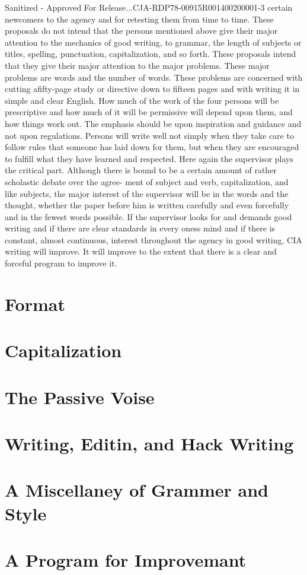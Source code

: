\documentclass[
    oneside,
    11pt,
    draft
]{memoir}
\begin{document}
Sanitized - Approved For Release...CJA-RDP78-00915R001400200001-3 certain newcomers to the agency and for retesting them from time to time. These proposals do not intend that the persons mentioned above give their major attention to the mechanics of good writing, to grammar, the length of subjects or titles, spelling, punctuation, capitalization, and so forth. These proposals intend that they give their major attention to the major problems. These major problems are words and the number of words. These problems are concerned with cutting afifty-page study or directive down to fifteen pages and with writing it in simple and clear English. How much of the work of the four persons will be prescriptive and how much of it will be permissive will depend upon them, and how things work out. The emphasis should be upon inspiration and guidance and not upon regulations. Persons will write well not simply when they take care to follow rules that someone has laid down for them, but when they are encouraged to fulfill what they have learned and respected. Here again the supervisor plays the critical part. Although there is bound to be a certain amount of rather scholastic debate over the agree- ment of subject and verb, capitalization, and like subjects, the major interest of the supervisor will be in the words and the thought, whether the paper before him is written carefully and even forcefully and in the fewest words possible. If the supervisor looks for and demands good writing and if there are clear standards in every oness mind and if there is constant, almost continuous, interest throughout the agency in good writing, CIA writing will improve. It will improve to the extent that there is a clear and forceful program to improve it.

\chapter{Format}
\chapter{Capitalization}
\chapter{The Passive Voise}
\chapter{Writing, Editin, and Hack Writing}
\chapter{A Miscellaney of Grammer and Style}
\chapter{A Program for Improvemant}
\end{document}
